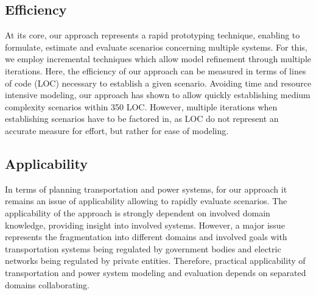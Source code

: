 \subsection{Efficiency}

At its core, our approach represents a rapid prototyping technique, enabling to formulate, estimate and evaluate scenarios concerning multiple systems. For this, we employ incremental techniques which allow model refinement through multiple iterations. Here, the efficiency of our approach can be measured in terms of lines of code (LOC) necessary to establish a given scenario. Avoiding time and resource intensive modeling, our approach has shown to allow quickly establishing medium complexity scenarios within 350 LOC. However, multiple iterations when establishing scenarios have to be factored in, as LOC do not represent an accurate measure for effort, but rather for ease of modeling.

\subsection{Applicability}

In terms of planning transportation and power systems, for our approach it remains an issue of applicability allowing to rapidly evaluate scenarios. The applicability of the approach is strongly dependent on involved domain knowledge, providing insight into involved systems. However, a major issue represents the fragmentation into different domains and involved goals with transportation systems being regulated by government bodies and electric networks being regulated by private entities. Therefore, practical applicability of transportation and power system modeling and evaluation depends on separated domains collaborating.
